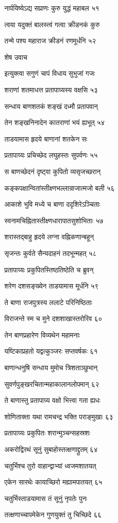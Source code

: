 नार्पयिष्येऽद्य सप्राणः कुरु युद्धं महाबल ५१

त्वया यदुक्तं बालस्त्वं गत्वा क्रीडनकं कुरु

तन्मे पश्य महाराज क्रीडनं रणमूर्धनि ५२

शेष उवाच

इत्युक्त्वा सगुणं चापं विधाय सुभुजां गजः

शराणां शतमाधत्त प्रतापाग्र्यस्य वक्षसि ५३

सन्धाय बाणशतकं शङ्खं दध्मौ प्रतापवान्

तेन शङ्खनिनादेन कातराणां भयं ह्यभूत् ५४

ताडयामास हृदये बाणानां शतकेन सः

प्रतापाग्र्यः प्रचिच्छेद लघुहस्तः सुपर्वणः ५५

स बाणच्छेदनं दृष्ट्वा कुपितो व्यसृजच्छरान्

कङ्कपक्षान्वितांस्तीक्ष्णभल्लान्राजात्मजो बली ५६

आकाशे भुवि मध्ये च बाणा ददृशिरेऽञ्चिताः

स्वनामचिह्नितास्तीक्ष्णधारापातसुशोभिताः ५७

शरास्तद्बाहु हृदये लग्ना वह्निकणान्बहून्

सृजन्तः कुर्वते सैन्यदाहनं तदभून्महत् ५८

प्रतापाग्र्यः प्रकुपितस्तिष्ठतिष्ठेति च ब्रुवन्

शरेण दशसङ्ख्येन ताडयामास मूर्धनि ५९

ते बाणा राजपुत्रस्य ललाटे परिनिष्ठिताः

विराजन्ते स्म च मुने दशशाखास्तरोरिव ६०

तेन बाणप्रहारेण विव्यथेन महामनाः

यष्टिकाप्रहतो यद्वत्कुञ्जरः सप्तवर्षकः ६१

बाणान्धनुषि सन्धाय मुमोच त्रिशताञ्छुभान्

सुवर्णपुङ्खरचितान्महाकालानलोपमान् ६२

ते बाणास्तु प्रतापाग्र्य वक्षो भित्त्वा गता ह्यधः

शोणिताक्ता यथा रामचन्द्र भक्ति पराङ्मुखाः ६३

प्रतापाग्र्यः प्रकुपितः शरान्मुञ्चन्सहस्रशः

अकरोद्विरथं सूनुं सुबाहोस्तत्क्षणाद्द्रुतम् ६४

चतुर्भिश्च तुरो वाहान्द्वाभ्यां ध्वजमशातयत्

एकेन सारथेः कायाच्छिरो मह्यामपातयत् ६५

चतुर्भिस्ताडयामास तं सूनुं नृपतेः पुनः

तत्क्षणाच्चापमेकेन गुणयुक्तं तु चिच्छिदे ६६

